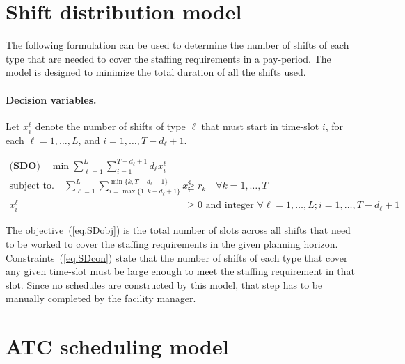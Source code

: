 \documentclass[11pt]{article}
\begin{document}
\section{Shift distribution model}
The following formulation can be used to determine the number of shifts of each type  that are needed to cover the staffing requirements in a pay-period. The model is designed to minimize the total duration of all the shifts used.

\paragraph{Decision variables.} Let $x_i^\ell$ denote the number of shifts of type $\ell$ that must start in time-slot $i$, for each $\ell = 1,\ldots,L$, and $i = 1,\ldots, T-d_\ell+1$.

\begin{align}
\label{eq.SDobj}\textbf{(SDO)}\quad\min \sum_{\ell =1}^L\sum_{i=1}^{T-d_\ell+1}d_\ell x_i^\ell & \\
\label{eq.SDcon} \text{subject to.}  \quad  \sum_{\ell=1}^L\sum_{i=\max\{1,k-d_\ell+1\}}^{\min\{k,T-d_\ell+1\}}x_i^\ell &\ge r_k \quad \forall k =1,\ldots,T\\
x_i^\ell & \ge 0 \text{ and integer } \forall \ell = 1,\ldots,L;  i = 1,\ldots, T-d_\ell+1
\end{align}

The objective~(\ref{eq.SDobj}) is the total number of slots across all shifts that need to be worked to cover the staffing requirements in the given planning horizon. Constraints~(\ref{eq.SDcon}) state that the number of shifts of each type that cover any given time-slot must be large enough to meet the staffing requirement in that slot. Since no schedules are constructed by this model, that step has to be manually completed by the facility manager. 

\section{ATC scheduling model}
\end{document}
